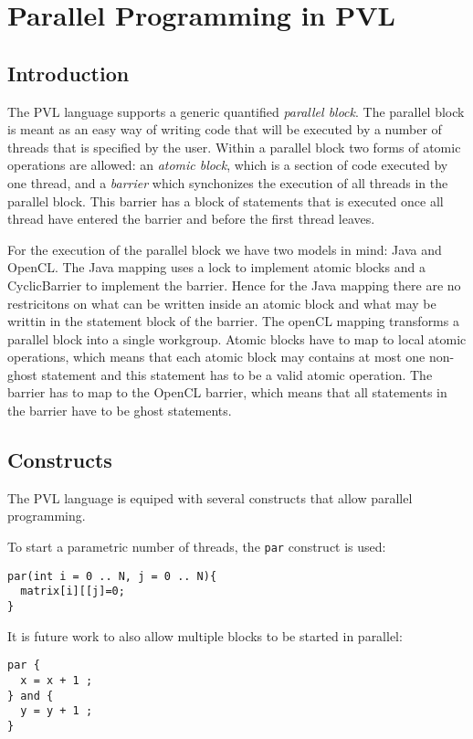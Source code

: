 
\chapter{Parallel Programming in PVL}


\section{Introduction}

The PVL language supports a generic quantified \emph{parallel block}.
The parallel block is meant as an easy way of writing code that
will be executed by a number of threads that is specified by
the user. Within a parallel block two forms of atomic operations
are allowed: an \emph{atomic block}, which is a section of
code executed by one thread, and a \emph{barrier} which synchonizes
the execution of all threads in the parallel block. This barrier
has a block of statements that is executed once all thread have entered the barrier
and before the first thread leaves.

For the execution of the parallel block we have two models in mind:
Java and OpenCL. The Java mapping uses a lock to implement atomic blocks
and a CyclicBarrier to implement the barrier. Hence for the Java mapping
there are no restricitons on what can be written inside an atomic block
and what may be writtin in the statement block of the barrier.
The openCL mapping transforms a parallel block into a single workgroup.
Atomic blocks have to map to local atomic operations, which means
that each atomic block may contains at most one non-ghost statement
and this statement has to be a valid atomic operation.
The barrier has to map to the OpenCL barrier, which means that
all statements in the barrier have to be ghost statements.

\section{Constructs}

The PVL language is equiped with several constructs that allow
parallel programming.

To start a parametric number of threads,
the \lstinline+par+ construct is used:
\begin{lstlisting}
par(int i = 0 .. N, j = 0 .. N){
  matrix[i][[j]=0;
}
\end{lstlisting}

It is future work to also allow multiple blocks to be started
in parallel:
\begin{lstlisting}
par {
  x = x + 1 ;
} and {
  y = y + 1 ;
}
\end{lstlisting}

